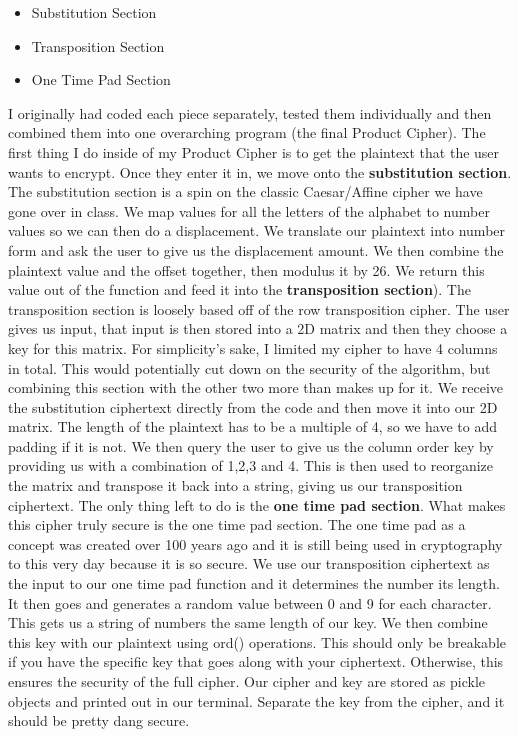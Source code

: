 \documentclass{article}
\begin{document}
\begin{itemize}
	\item Substitution Section
	\item Transposition Section
	\item One Time Pad Section
\end{itemize}
I originally had coded each piece separately, tested them individually and then combined them into one overarching program (the final Product Cipher).
The first thing I do inside of my Product Cipher is to get the plaintext that the user wants to encrypt. Once they enter it in, we move onto the \textbf{substitution section}. 
The substitution section is a spin on the classic Caesar/Affine cipher we have gone over in class. We map values for all the letters of the alphabet to number values so we can then do a displacement. We translate our plaintext into number form and ask the user to give us the displacement amount. We then combine the plaintext value and the offset together, then modulus it by 26. We return this value out of the function and feed it into the \textbf{transposition section}). \newline
The transposition section is loosely based off of the row transposition cipher. The user gives us input, that input is then stored into a 2D matrix and then they choose a key for this matrix. For simplicity's sake, I limited my cipher to have 4 columns in total. This would potentially cut down on the security of the algorithm, but combining this section with the other two more than makes up for it. We receive the substitution ciphertext directly from the code and then move it into our 2D matrix. The length of the plaintext has to be a multiple of 4, so we have to add padding if it is not. We then query the user to give us the column order key by providing us with a combination of 1,2,3 and 4. This is then used to reorganize the matrix and transpose it back into a string, giving us our transposition ciphertext. The only thing left to do is the \textbf{one time pad section}.\newline
What makes this cipher truly secure is the one time pad section. The one time pad as a concept was created over 100 years ago and it is still being used in cryptography to this very day because it is so secure. We use our transposition ciphertext as the input to our one time pad function and it determines the number its length. It then goes and generates a random value between 0 and 9 for each character. This gets us a string of numbers the same length of our key. We then combine this key with our plaintext using ord() operations. This should only be breakable if you have the specific key that goes along with your ciphertext. Otherwise, this ensures the security of the full cipher. Our cipher and key are stored as pickle objects and printed out in our terminal. Separate the key from the cipher, and it should be pretty dang secure. \newline
\end{document}
